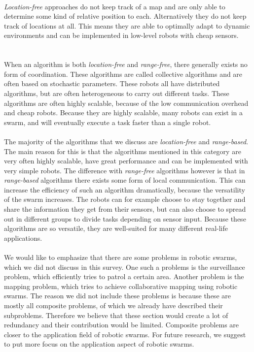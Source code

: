 \\
\emph{Location-free} approaches do not keep track of a map and are only able to determine some kind of relative position to each.
Alternatively they do not keep track of locations at all. 
This means they are able to optimally adapt to dynamic environments and can be implemented in low-level robots with cheap sensors. \\
\\
\\
When an algorithm is both \emph{location-free} and \emph{range-free}, there generally exists no form of coordination. 
These algorithms are called collective algorithms and are often based on stochastic parameters. 
These robots all have distributed algorithms, but are often heterogeneous to carry out different tasks.
These algorithms are often highly scalable, because of the low communication overhead and cheap robots. 
Because they are highly scalable, many robots can exist in a swarm, and will eventually execute a task faster than a single robot.\\
\\
The majority of the algorithms that we discuss are \emph{location-free} and \emph{range-based}.
The main reason for this is that the algorithms mentioned in this category are very often highly scalable, have great performance and can be implemented with very simple robots. 
The difference with \emph{range-free} algorithms however is that in \emph{range-based} algorithms there exists some form of local communication.
This can increase the efficiency of such an algorithm dramatically, because the versatility of the swarm increases.
The robots can for example choose to stay together and share the information they get from their sensors, but can also choose to spread out in different groups to divide tasks depending on sensor input. 
Because these algorithms are so versatile, they are well-suited for many different real-life applications.\\
\\
We would like to emphasize that there are some problems in robotic swarms, which we did not discuss in this survey.
One such a problems is the surveillance problem, which efficiently tries to patrol a certain area. 
Another problem is the mapping problem, which tries to achieve collaborative mapping using robotic swarms.
The reason we did not include these problems is because these are mostly all composite problems, of which we already have described their subproblems.
Therefore we believe that these section would create a lot of redundancy and their contribution would be limited.
Composite problems are closer to the application field of robotic swarms.
For future research, we suggest to put more focus on the application aspect of robotic swarms. 

